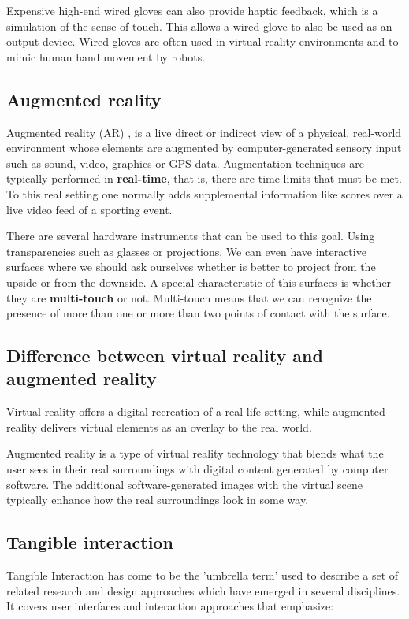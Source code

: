 Expensive high-end wired gloves can also provide haptic feedback, which is a simulation of the sense of touch. This allows a wired glove to also be used as an output device. Wired gloves are often used in virtual reality environments and to mimic human hand movement by robots.


\subsection{Augmented reality}

Augmented reality (AR) , is a live direct or indirect view of a physical, real-world environment whose elements are augmented by computer-generated sensory input such as sound, video, graphics or GPS data. Augmentation techniques are typically performed in \textbf{real-time}, that is, there are time limits that must be met. To this real setting one normally adds supplemental information like scores over a live video feed of a sporting event.

There are several hardware instruments that can be used to this goal. Using transparencies such as glasses or projections. We can even have interactive surfaces where we should ask ourselves whether is better to project from the upside or from the downside. A special characteristic of this surfaces is whether they are \textbf{multi-touch} or not. Multi-touch means that we can recognize the presence of more than one or more than two points of contact with the surface.

\subsection{Difference between virtual reality and augmented reality}

Virtual reality offers a digital recreation of a real life setting, while augmented reality delivers virtual elements as an overlay to the real world. 

Augmented reality is a type of virtual reality technology that blends what the user sees in their real surroundings with digital content generated by computer software. The additional software-generated images with the virtual scene typically enhance how the real surroundings look in some way. 

\subsection{Tangible interaction}

Tangible Interaction has come to be the 'umbrella term' used to describe a set of related research and design approaches which have emerged in several disciplines. It covers user interfaces and interaction approaches that emphasize:

